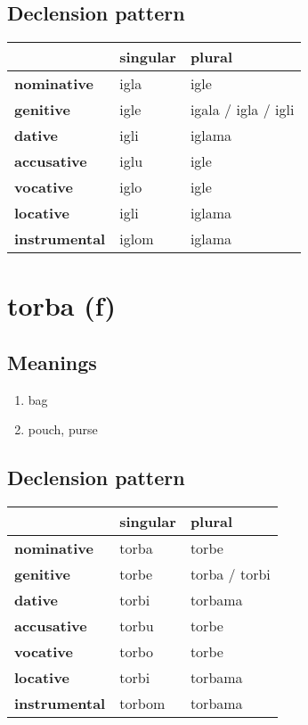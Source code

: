 \subsection*{Declension pattern}
\begin{tabularx}{\linewidth}{Xll}
\toprule
{} & singular &               plural \\
\midrule
\textbf{nominative  } &     igla &                 igle \\
\textbf{genitive    } &     igle &  igala / igla / igli \\
\textbf{dative      } &     igli &               iglama \\
\textbf{accusative  } &     iglu &                 igle \\
\textbf{vocative    } &     iglo &                 igle \\
\textbf{locative    } &     igli &               iglama \\
\textbf{instrumental} &    iglom &               iglama \\
\bottomrule
\end{tabularx}

\filbreak
\section{torba (f)}
\subsection*{Meanings}
\begin{enumerate}
\item bag
\item pouch, purse
\end{enumerate}
\subsection*{Declension pattern}
\begin{tabularx}{\linewidth}{Xll}
\toprule
{} & singular &         plural \\
\midrule
\textbf{nominative  } &    torba &          torbe \\
\textbf{genitive    } &    torbe &  torba / torbi \\
\textbf{dative      } &    torbi &        torbama \\
\textbf{accusative  } &    torbu &          torbe \\
\textbf{vocative    } &    torbo &          torbe \\
\textbf{locative    } &    torbi &        torbama \\
\textbf{instrumental} &   torbom &        torbama \\
\bottomrule
\end{tabularx}

